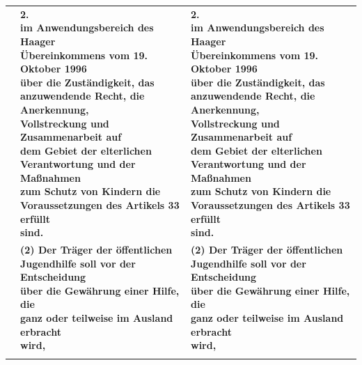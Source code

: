 \documentclass[10pt,a4paper,landscape]{article}
\begin{document}
\begin{longtable}{|L{8.2cm}|L{8.2cm}|L{8.2cm}|}
 & \textbf{2.   \newline im Anwendungsbereich des Haager  \newline Übereinkommens vom 19. Oktober 1996  \newline über die Zuständigkeit, das  \newline anzuwendende Recht, die Anerkennung,  \newline Vollstreckung und Zusammenarbeit auf  \newline dem Gebiet der elterlichen  \newline Verantwortung und der Maßnahmen  \newline zum Schutz von Kindern die  \newline Voraussetzungen des Artikels 33 erfüllt  \newline sind. } & \textbf{2.   \newline im Anwendungsbereich des Haager  \newline Übereinkommens vom 19. Oktober 1996  \newline über die Zuständigkeit, das  \newline anzuwendende Recht, die Anerkennung,  \newline Vollstreckung und Zusammenarbeit auf  \newline dem Gebiet der elterlichen  \newline Verantwortung und der Maßnahmen  \newline zum Schutz von Kindern die  \newline Voraussetzungen des Artikels 33 erfüllt  \newline sind. } \\
\hhline{|---|}
 & \textbf{(2) Der Träger der öffentlichen  \newline Jugendhilfe soll vor der Entscheidung  \newline über die Gewährung einer Hilfe, die  \newline ganz oder teilweise im Ausland erbracht  \newline wird, } & \textbf{(2) Der Träger der öffentlichen  \newline Jugendhilfe soll vor der Entscheidung  \newline über die Gewährung einer Hilfe, die  \newline ganz oder teilweise im Ausland erbracht  \newline wird, } \\
\hhline{|---|}

\end{longtable}
\end{document}
